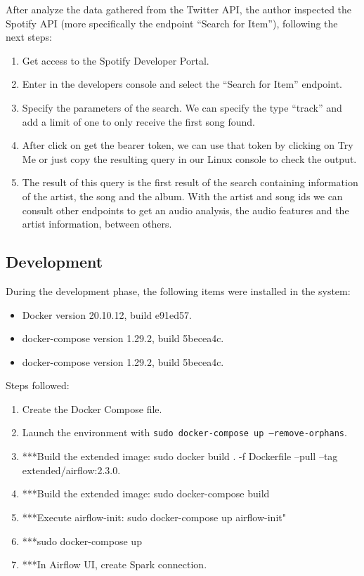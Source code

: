 \nonzeroparskip After analyze the data gathered from the Twitter API,  the author inspected the Spotify API (more specifically the endpoint ``Search for Item''), following the next steps:
\begin{enumerate}
	\item Get access to the Spotify Developer Portal.
	\item Enter in the developers console and select the ``Search for Item'' endpoint.
	\item Specify the parameters of the search. We can specify the type ``track'' and add a limit of one to only receive the first song found.
	\item After click on get the bearer token, we can use that token by clicking on Try Me or just copy the resulting query in our Linux console to check the output.
	\item The result of this query is the first result of the search containing information of the artist, the song and the album. With the artist and song ids we can consult other endpoints to get an audio analysis, the audio features and the artist information, between others.
\end{enumerate}

\subsection{Development}
\nonzeroparskip During the development phase, the following items were installed in the system:
\begin{itemize}
	\item Docker version 20.10.12, build e91ed57.
	\item docker-compose version 1.29.2, build 5becea4c.
	\item docker-compose version 1.29.2, build 5becea4c.
\end{itemize}

\nonzeroparskip Steps followed:
\begin{enumerate}
	\item Create the Docker Compose file.
	\item Launch the environment with \texttt{sudo docker-compose up --remove-orphans}.
	\item ***Build the extended image: sudo docker build . -f Dockerfile --pull --tag extended/airflow:2.3.0.
	\item ***Build the extended image: sudo docker-compose build
	\item ***Execute airflow-init: sudo docker-compose up airflow-init"
	\item ***sudo docker-compose up
	\item ***In Airflow UI, create Spark connection.
\end{enumerate}

